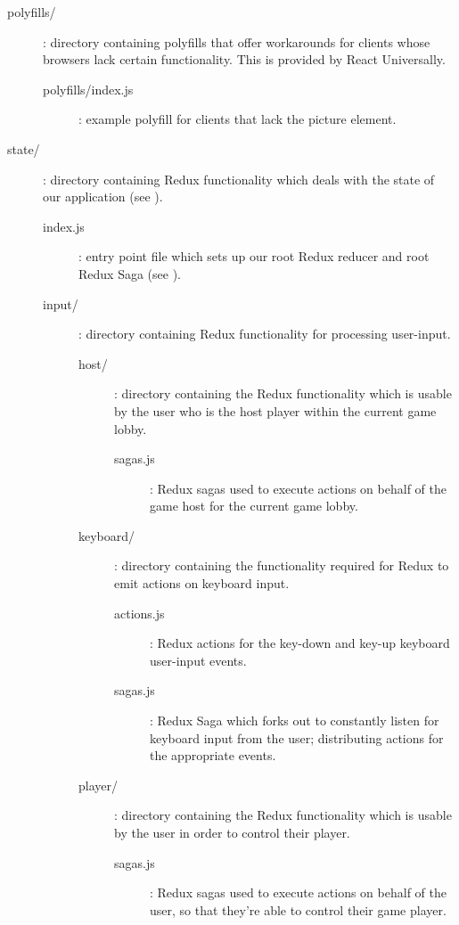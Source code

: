 \documentclass{standalone}
\begin{document}
\begin{formal}
\begin{description}
\begin{description}
\begin{description}
		        	\item[polyfills/]: directory containing polyfills that offer workarounds for clients whose browsers lack certain functionality. This is provided by React Universally.
		      		\begin{description}
		        		\item[polyfills/index.js]: example polyfill for clients that lack the picture element.
	        		\end{description}

		        	\item[state/]: directory containing Redux functionality which deals with the state of our application (see ).
		      		\begin{description}
			        	\item[index.js]: entry point file which sets up our root Redux reducer and root Redux Saga (see ).

			        	\item[input/]: directory containing Redux functionality for processing user-input.
		      			\begin{description}
				        	\item[host/]: directory containing the Redux functionality which is usable by the user who is the host player within the current game lobby.
		      				\begin{description}
				        		\item[sagas.js]: Redux sagas used to execute actions on behalf of the game host for the current game lobby.
		      				\end{description}

				        	\item[keyboard/]: directory containing the functionality required for Redux to emit actions on keyboard input.
		      				\begin{description}
				        		\item[actions.js]: Redux actions for the key-down and key-up keyboard user-input events.
				        		\item[sagas.js]: Redux Saga which forks out to constantly listen for keyboard input from the user; distributing actions for the appropriate events.
		      				\end{description}

		      				\item[player/]: directory containing the Redux functionality which is usable by the user in order to control their player.
		      				\begin{description}
				        		\item[sagas.js]: Redux sagas used to execute actions on behalf of the user, so that they're able to control their game player.
		      				\end{description}
		      			\end{description}


\end{description}
\end{description}
\end{description}
\end{description}
\end{formal}
\end{document}
